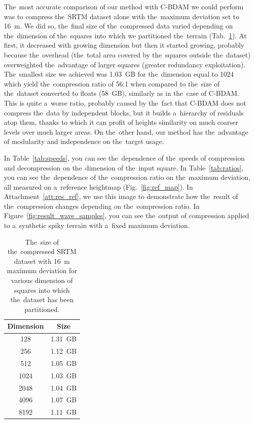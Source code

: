 The~most accurate comparison of our method with C-BDAM we could perform was to compress the~SRTM dataset alone with the~maximum deviation set to 16~m. We did so, the~final size of the~compressed data varied depending on the~dimension of the~squares into which we partitioned the~terrain (Tab.~\ref{tab:srtm}). At first, it decreased with growing dimension but then it started growing, probably because the~overhead (the~total area covered by the~squares outside the~dataset) overweighted the~advantage of larger squares (greater redundancy exploitation). The~smallest size we achieved was 1.03~GB for the~dimension equal to 1024 which yield the~compression ratio of 56:1 when compared to the~size of the~dataset converted to floats (58~GB), similarly as in the~case of C-BDAM. This is quite a~worse ratio, probably caused by the~fact that C-BDAM does not compress the~data by independent blocks, but it builds a~hierarchy of residuals atop them, thanks to which it can profit of heights similarity on much coarser levels over much larger areas. On the~other hand, our method has the~advantage of modularity and independence on the~target usage.

In Table~\ref{tab:speeds}, you can see the~dependence of the~speeds of compression and decompression on the~dimension of the~input square. In Table~\ref{tab:ratios}, you can see the~dependence of the~compression ratio on the~maximum deviation, all measured on a~reference heightmap (Fig.~\ref{fig:ref_map}). In Attachment~\ref{att:res_ref}, we use this image to demonstrate how the~result of the~compression changes depending on the~compression ratio. In Figure~\ref{fig:result_wave_samples}, you can see the~output of compression applied to a~synthetic spiky terrain with a~fixed maximum deviation.

\begin{table}
	\begin{center}
		\begin{tabular}{ | c | c | }
			\hline
			Dimension & Size \\ \hline
			128 & 1.31~GB  \\ \hline
			256 & 1.12~GB \\ \hline
			512 & 1.05~GB  \\ \hline
			1024 & 1.03~GB \\ \hline
			2048 & 1.04~GB \\ \hline
			4096 & 1.07~GB \\ \hline
			8192 & 1.11~GB \\ \hline
		\end{tabular}
		\caption{The~size of the~compressed SRTM dataset with 16~m maximum deviation for various dimension of squares into which the~dataset has been partitioned.}
		\label{tab:srtm}
	\end{center}
\end{table}

